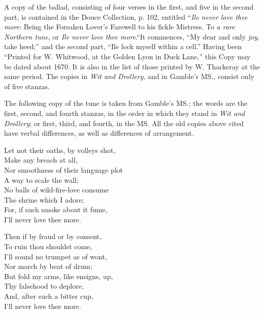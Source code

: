 A copy of the ballad, consisting of four verses in the first, and five in the
\pagebreak%
second part, is contained in the Douce Collection, p. 102, entitled “\textit{Ile never love
thee more}: Being the Forsaken Lover’s Farewell to his fickle Mistress. To \textit{a rare
Northern tune}, or \textit{Ile never love thee more}.“It commences, “My dear and only
\textit{joy}, take heed;” and the second part, “Ile lock myself within a cell.” Having
been “Printed for W. Whitwood, at the Golden Lyon in Duck Lane,” this Copy
may be dated about 1670. It is also in the list of those printed by W.
Thackeray at the same period. The copies in \textit{Wit and Drollery}, and in Gamble’s
MS., consist only of five stanzas.

The following copy of the tune is taken from Gamble’s MS.; the words are the
first, second, and fourth stanzas, in the order in which they stand in \textit{Wit and
Drollery}; or first, third, and fourth, in the MS. All the old copies above cited
have verbal differences, as well as differences of arrangement.




\pagebreak%

\settowidth{\versewidth}{Nor smoothness of their language plot}
\begin{dcverse}\begin{altverse}
Let not their oaths, by volleys shot,\\
Make any breach at all,\\
Nor smoothness of their language plot\\
A way to scale the wall;\\
No balls of wild-fire-love consume\\
The shrine which I adore;\\
For, if such smoke about it fume,\\
I’ll never love thee more.
\end{altverse}

\begin{altverse}
Then if by fraud or by consent,\\
To ruin thou shouldst come,\\
I’ll sound no trumpet as of wont,\\
Nor march by beat of drum;\\
But fold my arms, like ensigns, up,\\
Thy falsehood to deplore,\\
And, after such a bitter cup,\\
I’ll never love thee more.
\end{altverse}
\end{dcverse}

